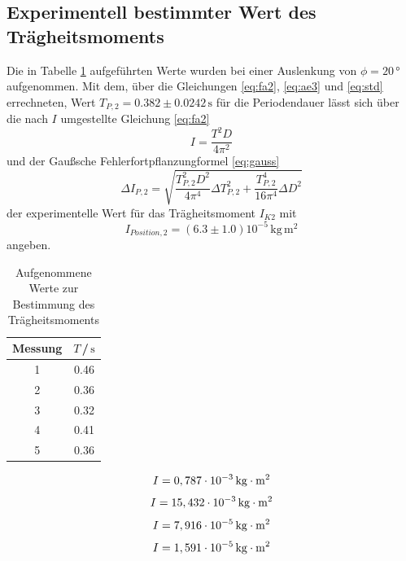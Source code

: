 \subsection{Experimentell bestimmter Wert des Trägheitsmoments}
 
Die in Tabelle \ref{tab:furlan} aufgeführten Werte wurden bei einer 
Auslenkung von $\phi = 20\,°$ aufgenommen. Mit dem, über die Gleichungen \ref{eq:fa2}, \ref{eq:ae3} und \ref{eq:std} errechneten, 
Wert $T_{P,2} = 0.382 \pm 0.0242\, \si{\second}$
für die Periodendauer lässt sich über die nach $I$ umgestellte Gleichung \ref{eq:fa2}
\begin{equation}
    I = \frac{T^2 D}{4 \pi^2}
\end{equation}
und der Gaußsche Fehlerfortpflanzungformel \ref{eq:gauss}
\begin{equation} 
    \Delta I_{P,2} = \sqrt{\frac{T_{P,2}^2 D^2}{4 \pi^4}\Delta T_{P,2}^2 + \frac{T_{P,2}^4}{16 \pi^4}\Delta D^2} 
\end{equation}
\noindent
der experimentelle Wert für das Trägheitsmoment $I_{K2}$ mit
\begin{equation}
    I_{Position,2} = (6.3 \pm 1.0)10^{-5}\, \si{\kilogram}\,\si{\meter\squared}
\end{equation}
\noindent
angeben.

\begin{table}[H]
\normalsize

\centering
{}
\begin{tabular}{c c}
\toprule
    Messung  & $T$\,/\,$\si{\second}$ \\
    \midrule

1  &   0.46   \\
2  &   0.36   \\
3  &   0.32   \\
4  &   0.41   \\
5  &   0.36   \\

    \bottomrule
\end{tabular}
\caption{Aufgenommene Werte zur Bestimmung des Trägheitsmoments}
\label{tab:furlan}
\end{table}





\begin{equation*}
  I=0,787 \cdot 10^{-3}\,\si[inter-unit-product=\cdot]{\kilo\gram\meter\squared}
\end{equation*}
\begin{equation*}
  I=15,432 \cdot 10^{-3}\,\si[inter-unit-product=\cdot]{\kilo\gram\meter\squared}
\end{equation*}
\begin{equation*}
  I=7,916 \cdot 10^{-5}\,\si[inter-unit-product=\cdot]{\kilo\gram\meter\squared}
\end{equation*}
\begin{equation*}
  I=1,591 \cdot 10^{-5}\,\si[inter-unit-product=\cdot]{\kilo\gram\meter\squared}
\end{equation*}